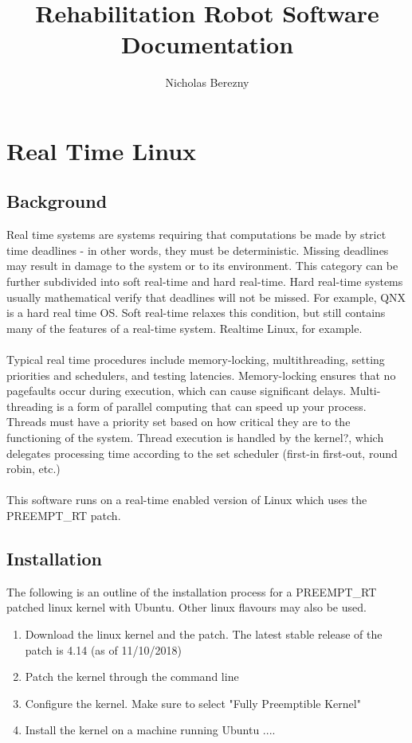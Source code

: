 \documentclass{article}
\author{Nicholas Berezny}
\title{Rehabilitation Robot Software Documentation}
\begin{document}
\maketitle
\newpage

\section{Real Time Linux}
	\subsection{Background}
	
	Real time systems are systems requiring that computations be made by strict time deadlines - in other words, they must be deterministic. Missing deadlines may result in damage to the system or to its environment. This category can be further subdivided into soft real-time and hard real-time. Hard real-time systems usually mathematical verify that deadlines will not be missed.  For example, QNX is a hard real time OS. Soft real-time relaxes this condition, but still contains many of the features of a real-time system. Realtime Linux, for example. 
	\\ \\
	Typical real time procedures include memory-locking, multithreading, setting priorities and schedulers, and testing latencies. Memory-locking ensures that no pagefaults occur during execution, which can cause significant delays. Multi-threading is a form of parallel computing that can speed up your process. Threads must have a priority set based on how critical they are to the functioning of the system. Thread execution is handled by the kernel?, which delegates processing time according to the set scheduler (first-in first-out, round robin, etc.) 
	\\ \\
	This software runs on a real-time enabled version of Linux which uses the PREEMPT\_RT patch. 
	
		
	
	\subsection{Installation}
	
	The following is an outline of the installation process for a PREEMPT\_RT patched linux kernel with Ubuntu. Other linux flavours may also be used. 
	\begin{enumerate}
		\item Download the linux kernel and the patch. The latest stable release of the patch is  4.14 (as of 11/10/2018)
		\item Patch the kernel through the command line
		\item Configure the kernel. Make sure to select "Fully Preemptible Kernel"
		\item Install the kernel on a machine running Ubuntu ....
	\end{enumerate}
	
\end{document}
